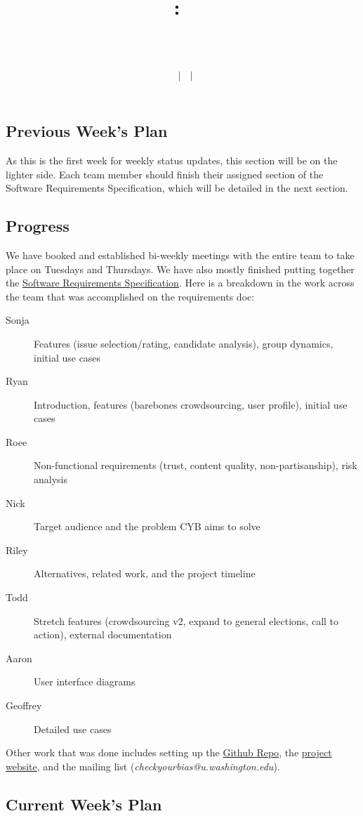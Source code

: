 \documentclass[12pt]{article}
\title{
    \vspace{2in}
    \textmd{\textbf{\hmwkClass:\ \hmwkTitle}}\\
    \vspace{0.1in}\large{\textit{\hmwkClassInstructor\ \hmwkClassTime}}\\
    \author{\textbf{\hmwkAuthorName\ $\vert$ \hmwkAuthorCSE\ $\vert$ \hmwkAuthorId}}
}
\date{}
\begin{document}
\subsection{Previous Week's Plan} 

As this is the first week for weekly status updates, this section will be on the lighter side. Each team member should finish their assigned section of the Software Requirements Specification, which will be detailed in the next section.

\subsection{Progress}

We have booked and established bi-weekly meetings with the entire team to take place on Tuesdays and Thursdays. We have also mostly finished putting together the \href{http://courses.cs.washington.edu/courses/cse403/16wi/assignments/project2.html}{Software Requirements Specification}. Here is a breakdown in the work across the team that was accomplished on the requirements doc:

\begin{description}
    \item[Sonja] Features (issue selection/rating, candidate analysis), group dynamics, initial use cases
    \item[Ryan] Introduction, features (barebones crowdsourcing, user profile), initial use cases
    \item[Roee] Non-functional requirements (trust, content quality, non-partisanship), risk analysis
    \item[Nick] Target audience and the problem CYB aims to solve
    \item[Riley] Alternatives, related work, and the project timeline
    \item[Todd] Stretch features (crowdsourcing v2, expand to general elections, call to action), external documentation
    \item[Aaron] User interface diagrams
    \item[Geoffrey] Detailed use cases
\end{description}

Other work that was done includes setting up the \href{https://github.com/aaronnech/CheckYourBias}{Github Repo}, the \href{https://aaronnech.github.io/CheckYourBias/}{project website}, and the mailing list ({\em checkyourbias@u.washington.edu}).

\subsection{Current Week's Plan}
\end{document}
